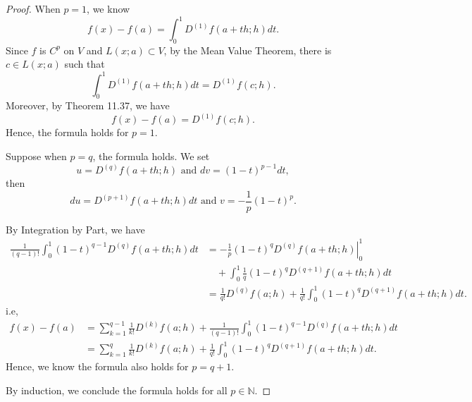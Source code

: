 \begin{Exercise}
\begin{proof}
When $p=1$, we know
$$
f(x)-f(a) = \int_{0}^{1}D^{(1)} f(a+t h;h) d t.
$$
Since $f$ is $C^p$ on $V$ and $L(x;a) \subset V$, by the Mean Value Theorem, there is $c\in L(x;a)$ such that
$$
\int_{0}^{1}D^{(1)} f(a+t h;h) d t = D^{(1)} f(c;h).
$$
Moreover, by Theorem 11.37, we have
$$
f(x)-f(a) = D^{(1)} f(c;h).
$$
Hence, the formula holds for $p=1$.

Suppose when $p=q$, the formula holds. We set 
$$
u=D^{(q)} f(a+t h; h) \text{ and } d v = (1-t)^{p-1}d t,
$$
then 
$$
d u=D^{(p+1)} f(a+t h; h)d t\text{ and } v=-\frac{1}{p}(1-t)^p.
$$

By Integration by Part, we have
\begin{align*}
\frac{1}{(q-1)!}\int_{0}^{1}(1-t)^{q-1}D^{(q)}f(a+t h;h)d t
&= \left. -\frac{1}{p}(1-t)^q D^{(q)} f(a+t h;h) \right|_{0}^{1} \\
&\quad + \int_{0}^{1}\frac{1}{q}(1-t)^{q} D^{(q+1)}f(a+t h;h)d t \\
&= \frac{1}{q!}D^{(q)}f(a;h) + \frac{1}{q!}\int_{0}^{1}(1-t)^{q} D^{(q+1)}f(a+t h;h)d t.
\end{align*}
i.e,
\begin{align*}
f(x)-f(a) &
= \sum_{k=1}^{q-1}\frac{1}{k!}D^{(k)}f(a;h)+\frac{1}{(q-1)!}\int_{0}^{1}(1-t)^{q-1}D^{(q)}f(a+t h;h)d t \\
&= \sum_{k=1}^{q}\frac{1}{k!}D^{(k)}f(a;h)+\frac{1}{q!}\int_{0}^{1}(1-t)^{q}D^{(q+1)}f(a+t h;h)d t.
\end{align*}
Hence, we know the formula also holds for $p=q+1$.

By induction, we conclude the formula holds for all $p\in\mathbb{N}$.
\end{proof}
\end{Exercise}